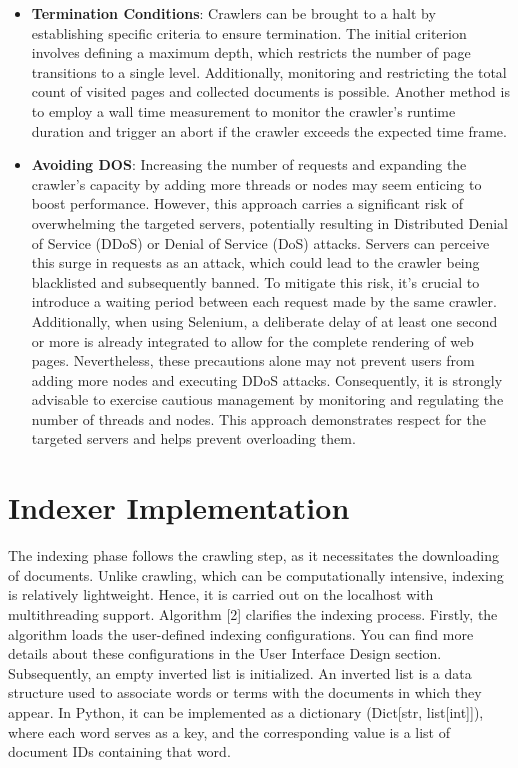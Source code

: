 \begin{itemize}
\item  \textbf{Termination Conditions}: Crawlers can be brought to a halt by establishing specific criteria to ensure termination. The initial criterion involves defining a maximum depth, which restricts the number of page transitions to a single level. Additionally, monitoring and restricting the total count of visited pages and collected documents is possible. Another method is to employ a wall time measurement to monitor the crawler's runtime duration and trigger an abort if the crawler exceeds the expected time frame.

\item  \textbf{Avoiding DOS}: Increasing the number of requests and expanding the crawler's capacity by adding more threads or nodes may seem enticing to boost performance. However, this approach carries a significant risk of overwhelming the targeted servers, potentially resulting in Distributed Denial of Service (DDoS) or Denial of Service (DoS) attacks. Servers can perceive this surge in requests as an attack, which could lead to the crawler being blacklisted and subsequently banned.
To mitigate this risk, it's crucial to introduce a waiting period between each request made by the same crawler. Additionally, when using Selenium, a deliberate delay of at least one second or more is already integrated to allow for the complete rendering of web pages. Nevertheless, these precautions alone may not prevent users from adding more nodes and executing DDoS attacks. Consequently, it is strongly advisable to exercise cautious management by monitoring and regulating the number of threads and nodes. This approach demonstrates respect for the targeted servers and helps prevent overloading them.
\end{itemize}

\section{Indexer Implementation}\label{sec:indexer-implementation}

The indexing phase follows the crawling step, as it necessitates the downloading of documents. Unlike crawling, which can be computationally intensive, indexing is relatively lightweight. Hence, it is carried out on the localhost with multithreading support.
Algorithm [2] clarifies the indexing process. Firstly, the algorithm loads the user-defined indexing configurations. You can find more details about these configurations in the User Interface Design section. Subsequently, an empty inverted list is initialized. An inverted list is a data structure used to associate words or terms with the documents in which they appear. In Python, it can be implemented as a dictionary (Dict[str, list[int]]), where each word serves as a key, and the corresponding value is a list of document IDs containing that word.


